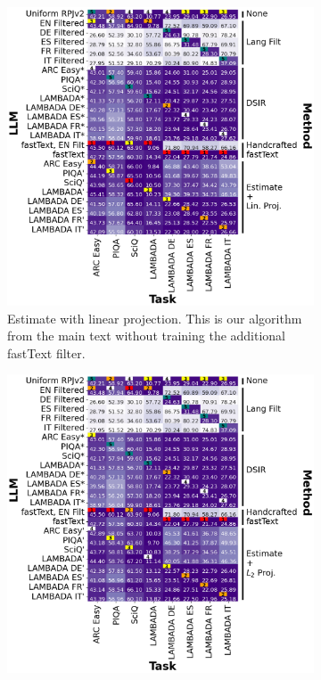 \documentclass{article} %
\begin{document}
\begin{figure}[t]
    \centering
    \begin{subfigure}[b]{0.49\textwidth}
        \centering
        \includegraphics[width=\textwidth]{images/llm-perf-heatmap-lin-proj.png}
        \caption{Estimate with linear projection. This is our algorithm from the main text without training the additional fastText filter.}
    \end{subfigure}\hfill
    \begin{subfigure}[b]{0.49\textwidth}
        \centering
        \includegraphics[width=\textwidth]{images/llm-perf-heatmap-l2-proj.png}

\end{subfigure}
\end{figure}
\end{document}
